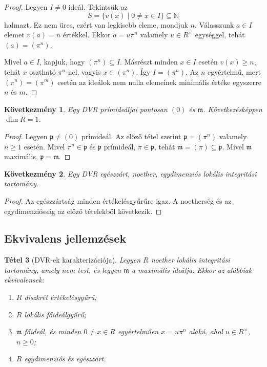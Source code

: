 \documentclass[11pt,a4paper]{article}
\newtheorem{tetel}{Tétel}[section]
\newtheorem{kovetkezmeny}[tetel]{Következmény}
\theoremstyle{definition}
\newcommand{\mm}{\mathfrak m}
\newcommand{\pp}{\mathfrak p}
\newcommand{\NN}{\mathbb N}
\begin{document}
\begin{proof}
Legyen $I\neq 0$ ideál. Tekintsük az
\[
  S=\{v(x)\mid 0\neq x\in I\}\subseteq \NN
\]
halmazt. Ez nem üres, ezért van legkisebb eleme, mondjuk $n$. Válasszunk
$a\in I$ elemet $v(a)=n$ értékkel. Ekkor $a=u\pi^n$ valamely
$u\in R^\times$ egységgel, tehát $(a)=(\pi^n)$.

Mivel $a\in I$, kapjuk, hogy $(\pi^n)\subseteq I$. Másrészt minden
$x\in I$ esetén $v(x)\geq n$, tehát $x$ osztható $\pi^n$-nel, vagyis
$x\in(\pi^n)$. Így $I=(\pi^n)$. Az $n$ egyértelmű, mert
$(\pi^n)=(\pi^m)$ esetén az ideálok nem nulla elemeinek minimális
értéke egyszerre $n$ és $m$.
\end{proof}

\begin{kovetkezmeny}
Egy DVR prímideáljai pontosan $(0)$ és $\mm$. Következésképpen $\dim R=1$.
\end{kovetkezmeny}

\begin{proof}
Legyen $\pp\neq (0)$ prímideál. Az előző tétel szerint
$\pp=(\pi^n)$ valamely $n\geq 1$ esetén. Mivel $\pi^n\in\pp$ és
$\pp$ prímideál, $\pi\in\pp$, tehát $\mm=(\pi)\subseteq\pp$. Mivel
$\mm$ maximális, $\pp=\mm$.
\end{proof}

\begin{kovetkezmeny}
Egy DVR egészzárt, noether, egydimenziós lokális integritási
tartomány.
\end{kovetkezmeny}

\begin{proof}
Az egészzártság minden értékelésgyűrűre igaz. A noetherség és
az egydimenziósság az előző tételekből következik.
\end{proof}

\subsection{Ekvivalens jellemzések}

\begin{tetel}[DVR-ek karakterizációja]
Legyen $R$ noether lokális integritási tartomány, amely nem test, és
legyen $\mm$ a maximális ideálja. Ekkor az alábbiak ekvivalensek:
\begin{enumerate}
  \item $R$ diszkrét értékelésgyűrű;
  \item $R$ lokális főideálgyűrű;
  \item $\mm$ főideál, és minden $0\neq x\in R$ egyértelműen
        $x=u\pi^n$ alakú, ahol $u\in R^\times$, $n\geq 0$;
  \item $R$ egydimenziós és egészzárt.
\end{enumerate}
\end{tetel}
\end{document}
